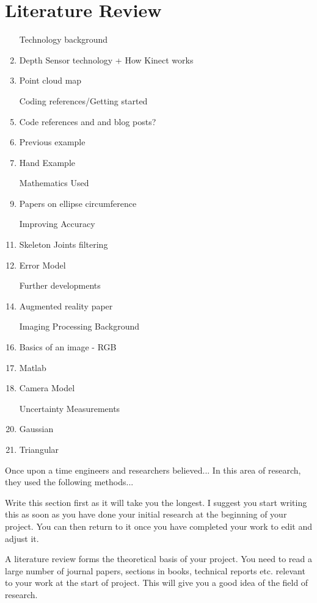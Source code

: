 \chapter{Literature Review}

\begin{enumerate}
	\item [Technology] background 
	\item Depth Sensor technology + How Kinect works
	\item Point cloud map
	
	\item [Coding] references/Getting started
	\item Code references and and blog posts? 
	\item Previous example
	\item Hand Example
	
	\item [Mathematics] Used
	\item Papers on ellipse circumference
	
	\item [Improving] Accuracy
	\item Skeleton Joints filtering
	\item Error Model
	
	\item [Further] developments
	\item Augmented reality paper
	
	\item [Imaging] Processing Background
	\item Basics of an image - RGB
	\item Matlab
	\item Camera Model
	
	\item [Uncertainty] Measurements
	\item Gaussian 
	\item Triangular
\end{enumerate}

Once upon a time engineers and researchers believed... In this area of research, they used the following methods... \cite{jct2010}

Write this section first as it will take you the longest. I suggest you start writing this as soon as you
have done your initial research at the beginning of your project. You can then return to it once you
have completed your work to edit and adjust it.

A literature review forms the theoretical basis of your project. You need to read a large number of
journal papers, sections in books, technical reports etc. relevant to your work at the start of project.
This will give you a good idea of the field of research.

